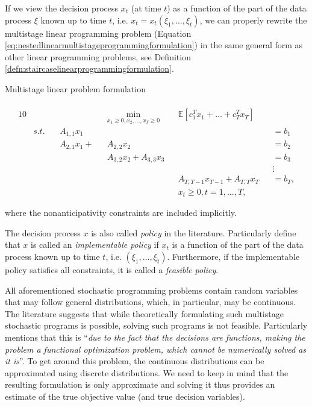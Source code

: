 If we view the decision process $x_t$ (at time $t$) as a function of the part of the data process $\xi$ known up to time $t$, i.e. $x_t=x_t(\xi_1,\dots,\xi_t)$, we can properly rewrite the multistage linear programming problem (Equation \ref{eq:nestedlinearmultistageprogrammingformulation}) in the same general form as other linear programming problems, see Definition \ref{defn:staircaselinearprogrammingformulation}.
\begin{defn}
{Multistage linear problem formulation} 
\label{defn:staircaselinearprogrammingformulation}
\\ 
\cite[Ch. 1, p. 22]{stochasticprogrammingbible}
\\
\footnotesize
\begin{alignat}{10}
\label{eq:staircaselinearprogrammingformulation}
& &&  && \underset{x_1 \geq 0, x_2,\dots,x_T {\geq} 0}{\mathrm{min}}  &&  \mathbb{E}\left[ c_1^Tx_1 + \dots +  c_T^Tx_T \right] && \\
& s.t. \, && A_{1,1}x_1 && && && {=} b_1 \nonumber \\
& && A_{2,1}x_1 +  && A_{2,2}x_2 && && {=} b_2 \nonumber \\
& && && A_{3,2}x_2  +  A_{3,3}x_3 && && {=} b_3 \nonumber \\
& && && && && \vdots \nonumber \\
& && && && A_{T,T-1}x_{T-1}  +  A_{T,T}x_T  && {=} b_T, \nonumber \\
& && && &&  x_t  \geq 0, t=1,\dots,T, &&  \nonumber
\end{alignat}
\normalsize
\end{defn}
\begin{flushleft}
where the nonanticipativity constraints are included implicitly.
\end{flushleft}
\begin{rem}
The decision process $x$ is also called \textit{policy} in the literature. Particularly \cite[p. 95, Definition 29]{stochasticprogrammingbible} define that $x$ is called an \textit{implementable policy} if $x_t$ is a function of the part of the data process known up to time $t$, i.e. $(\xi_1,\dots,\xi_t)$. Furthermore, if the implementable policy satisfies all constraints, it is called a \textit{feasible policy}.
\end{rem}

All aforementioned stochastic programming problems contain random variables that may follow general distributions, which, in particular, may be continuous. The literature suggests that while theoretically formulating such multistage stochastic programs is possible, solving such programs is not feasible. Particularly \cite{pflugscenariotreegeneration} mentions that this is “\textit{due to the fact that the decisions are functions, making the problem a functional optimization problem, which cannot be numerically solved as it is}”. To get around this problem, the continuous distributions can be approximated using discrete distributions. We need to keep in mind that the resulting formulation is only approximate and solving it thus provides an estimate of the true objective value (and true decision variables).
